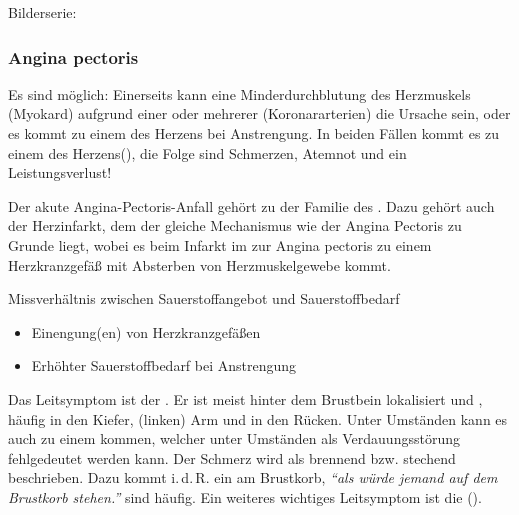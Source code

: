 {\begin{PictureSeriesWide}{}{Bilderserie:
}
\end{PictureSeriesWide}


\subsubsection{Angina pectoris}
\label{topic:angina-pectoris}




{%
Es sind  möglich:
Einerseits kann eine Minderdurchblutung des Herzmuskels
(Myokard)
  aufgrund einer oder mehrerer  (Koronararterien) die Ursache sein, oder
es kommt zu einem  des Herzens
bei
  Anstrengung.
In beiden Fällen kommt es zu einem  des
Herzens(), 
die Folge sind Schmerzen,
Atemnot und ein Leistungsverlust!

Der akute Angina-Pectoris-Anfall gehört zu der Familie des
. Dazu gehört auch der
Herzinfarkt, dem der gleiche Mechanismus wie der Angina Pectoris zu
Grunde liegt, wobei es beim Infarkt im  zur Angina
pectoris zu einem  Herzkranzgefäß
mit Absterben von Herzmuskelgewebe kommt.


}{
Missverhältnis zwischen Sauerstoffangebot und  
Sauerstoffbedarf
\begin{itemize}
  \item Einengung(en) von Herzkranzgefäßen
  \item Erhöhter Sauerstoffbedarf bei Anstrengung
\end{itemize}
}{}{}{}


{%
Das Leitsymptom ist der . Er ist meist hinter dem Brustbein
lokalisiert und , häufig in den
Kiefer, (linken) Arm und in den Rücken. Unter Umständen
kann es auch zu einem  kommen,
welcher unter Umständen als Verdauungsstörung fehlgedeutet
werden kann. Der Schmerz wird als brennend bzw. stechend
beschrieben. Dazu kommt i.\,d.\,R. ein  am
Brustkorb, \emph{\enquote{als würde jemand auf dem Brustkorb
stehen.}}  sind
häufig.
Ein weiteres wichtiges Leitsymptom ist die 
().

}}
